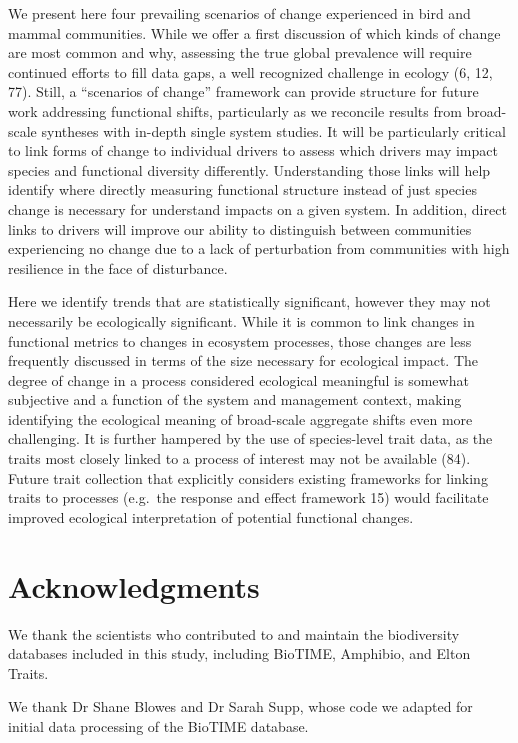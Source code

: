 \documentclass{article}
\begin{document}
We present here four prevailing scenarios of change experienced in bird
and mammal communities. While we offer a first discussion of which kinds
of change are most common and why, assessing the true global prevalence
will require continued efforts to fill data gaps, a well recognized
challenge in ecology (6, 12, 77). Still, a ``scenarios of change''
framework can provide structure for future work addressing functional
shifts, particularly as we reconcile results from broad-scale syntheses
with in-depth single system studies. It will be particularly critical to
link forms of change to individual drivers to assess which drivers may
impact species and functional diversity differently. Understanding those
links will help identify where directly measuring functional structure
instead of just species change is necessary for understand impacts on a
given system. In addition, direct links to drivers will improve our
ability to distinguish between communities experiencing no change due to
a lack of perturbation from communities with high resilience in the face
of disturbance.

Here we identify trends that are statistically significant, however they
may not necessarily be ecologically significant. While it is common to
link changes in functional metrics to changes in ecosystem processes,
those changes are less frequently discussed in terms of the size
necessary for ecological impact. The degree of change in a process
considered ecological meaningful is somewhat subjective and a function
of the system and management context, making identifying the ecological
meaning of broad-scale aggregate shifts even more challenging. It is
further hampered by the use of species-level trait data, as the traits
most closely linked to a process of interest may not be available (84).
Future trait collection that explicitly considers existing frameworks
for linking traits to processes (e.g.~the response and effect framework
15) would facilitate improved ecological interpretation of potential
functional changes.

\hypertarget{acknowledgments}{%
\section{Acknowledgments}\label{acknowledgments}}

We thank the scientists who contributed to and maintain the biodiversity
databases included in this study, including BioTIME, Amphibio, and Elton
Traits.

We thank Dr Shane Blowes and Dr Sarah Supp, whose code we adapted for
initial data processing of the BioTIME database.
\end{document}
